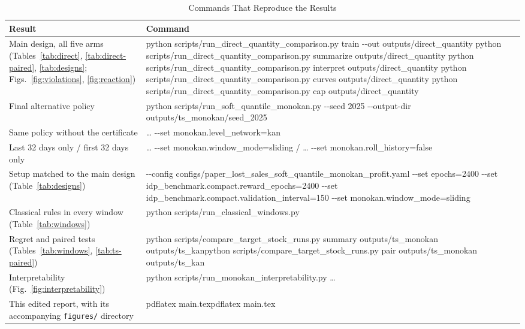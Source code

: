 \documentclass[conference]{IEEEtran}
\begin{document}
\begin{table}[!t]
\caption{Commands That Reproduce the Results}
\label{tab:commands}
\centering
\footnotesize
\begin{tabular}{@{}L{48mm}>{\raggedright\arraybackslash\ttfamily}p{125mm}@{}}
\toprule
Result & \normalfont Command \\
\midrule
Main design, all five arms (Tables~\ref{tab:direct}, \ref{tab:direct-paired}, \ref{tab:designs};
Figs.~\ref{fig:violations}, \ref{fig:reaction}) &
python scripts/run\_direct\_quantity\_comparison.py train -{}-out outputs/direct\_quantity\newline
python scripts/run\_direct\_quantity\_comparison.py summarize outputs/direct\_quantity\newline
python scripts/run\_direct\_quantity\_comparison.py interpret outputs/direct\_quantity\newline
python scripts/run\_direct\_quantity\_comparison.py curves outputs/direct\_quantity\newline
python scripts/run\_direct\_quantity\_comparison.py cap outputs/direct\_quantity \\
Final alternative policy & python scripts/run\_soft\_quantile\_monokan.py -{}-seed 2025 -{}-output-dir
outputs/ts\_monokan/seed\_2025 \\
Same policy without the certificate & \ldots{} -{}-set monokan.level\_network=kan \\
Last 32 days only / first 32 days only & \ldots{} -{}-set monokan.window\_mode=sliding \quad / \quad \ldots{} -{}-set
monokan.roll\_history=false \\
Setup matched to the main design (Table~\ref{tab:designs}) & -{}-config
configs/paper\_lost\_sales\_soft\_quantile\_monokan\_profit.yaml -{}-set epochs=2400 -{}-set
idp\_benchmark.compact.reward\_epochs=2400 -{}-set idp\_benchmark.compact.validation\_interval=150 -{}-set
monokan.window\_mode=sliding \\
Classical rules in every window (Table~\ref{tab:windows}) & python scripts/run\_classical\_windows.py \\
Regret and paired tests (Tables~\ref{tab:windows}, \ref{tab:ts-paired}) & python
scripts/compare\_target\_stock\_runs.py summary outputs/ts\_monokan outputs/ts\_kan\newline python
scripts/compare\_target\_stock\_runs.py pair outputs/ts\_monokan outputs/ts\_kan \\
Interpretability (Fig.~\ref{fig:interpretability}) & python
scripts/run\_monokan\_interpretability.py \ldots{} \\
This edited report, with its accompanying \texttt{figures/} directory & pdflatex main.tex\newline pdflatex main.tex \\
\bottomrule
\end{tabular}
\end{table}
\end{document}
